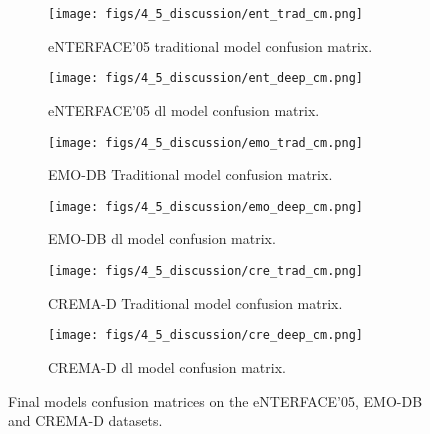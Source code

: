 \begin{figure}
	\begin{subfigure}{.5\textwidth}
		\centering
		\texttt{[image: figs/4\_5\_discussion/ent\_trad\_cm.png]}
		\caption{eNTERFACE'05 traditional model confusion matrix.}
	\end{subfigure}%
	\begin{subfigure}{.5\textwidth}
		\centering
		\texttt{[image: figs/4\_5\_discussion/ent\_deep\_cm.png]}
		\caption{eNTERFACE'05 \ac{dl} model confusion matrix.}
	\end{subfigure}
	\newline
	\begin{subfigure}{.5\textwidth}
		\centering
		\texttt{[image: figs/4\_5\_discussion/emo\_trad\_cm.png]}
		\caption{EMO-DB Traditional model confusion matrix.}
	\end{subfigure}%
	\begin{subfigure}{.5\textwidth}
		\centering
		\texttt{[image: figs/4\_5\_discussion/emo\_deep\_cm.png]}
		\caption{EMO-DB \ac{dl} model confusion matrix.}
	\end{subfigure}
	\newline
	\begin{subfigure}{.5\textwidth}
		\centering
		\texttt{[image: figs/4\_5\_discussion/cre\_trad\_cm.png]}
		\caption{CREMA-D Traditional model confusion matrix.}
	\end{subfigure}%
	\begin{subfigure}{.5\textwidth}
		\centering
		\texttt{[image: figs/4\_5\_discussion/cre\_deep\_cm.png]}
		\caption{CREMA-D \ac{dl} model confusion matrix.}
	\end{subfigure}
	\caption{Final models confusion matrices on the eNTERFACE'05, EMO-DB and CREMA-D datasets.}
	\label{fig:final_cm}
\end{figure}

